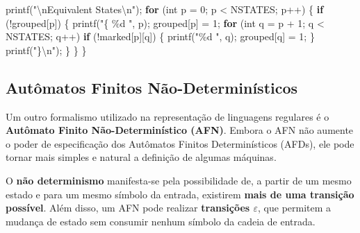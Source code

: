 \documentclass[
  brazilian,
  letterpaper,
]{book}
\newenvironment{Shaded}{\begin{snugshade}}{\end{snugshade}}
\newcommand{\ControlFlowTok}[1]{\textcolor[rgb]{0.00,0.23,0.31}{\textbf{#1}}}
\newcommand{\DataTypeTok}[1]{\textcolor[rgb]{0.68,0.00,0.00}{#1}}
\newcommand{\DecValTok}[1]{\textcolor[rgb]{0.68,0.00,0.00}{#1}}
\newcommand{\NormalTok}[1]{\textcolor[rgb]{0.00,0.23,0.31}{#1}}
\newcommand{\OperatorTok}[1]{\textcolor[rgb]{0.37,0.37,0.37}{#1}}
\newcommand{\SpecialCharTok}[1]{\textcolor[rgb]{0.37,0.37,0.37}{#1}}
\newcommand{\StringTok}[1]{\textcolor[rgb]{0.13,0.47,0.30}{#1}}
\theoremstyle{plain}
\theoremstyle{definition}
\theoremstyle{remark}
\begin{document}
\begin{Shaded}
\begin{Highlighting}[]
\NormalTok{    printf}\OperatorTok{(}\StringTok{"}\SpecialCharTok{\textbackslash{}n}\StringTok{Equivalent States}\SpecialCharTok{\textbackslash{}n}\StringTok{"}\OperatorTok{);}
    \ControlFlowTok{for} \OperatorTok{(}\DataTypeTok{int}\NormalTok{ p }\OperatorTok{=} \DecValTok{0}\OperatorTok{;}\NormalTok{ p }\OperatorTok{\textless{}}\NormalTok{ NSTATES}\OperatorTok{;}\NormalTok{ p}\OperatorTok{++)}
    \OperatorTok{\{}
        \ControlFlowTok{if} \OperatorTok{(!}\NormalTok{grouped}\OperatorTok{[}\NormalTok{p}\OperatorTok{])}
        \OperatorTok{\{}
\NormalTok{            printf}\OperatorTok{(}\StringTok{"\{ }\SpecialCharTok{\%d}\StringTok{ "}\OperatorTok{,}\NormalTok{ p}\OperatorTok{);}
\NormalTok{            grouped}\OperatorTok{[}\NormalTok{p}\OperatorTok{]} \OperatorTok{=} \DecValTok{1}\OperatorTok{;}
            \ControlFlowTok{for} \OperatorTok{(}\DataTypeTok{int}\NormalTok{ q }\OperatorTok{=}\NormalTok{ p }\OperatorTok{+} \DecValTok{1}\OperatorTok{;}\NormalTok{ q }\OperatorTok{\textless{}}\NormalTok{ NSTATES}\OperatorTok{;}\NormalTok{ q}\OperatorTok{++)}
                \ControlFlowTok{if} \OperatorTok{(!}\NormalTok{marked}\OperatorTok{[}\NormalTok{p}\OperatorTok{][}\NormalTok{q}\OperatorTok{])} \OperatorTok{\{}
\NormalTok{                    printf}\OperatorTok{(}\StringTok{"}\SpecialCharTok{\%d}\StringTok{ "}\OperatorTok{,}\NormalTok{ q}\OperatorTok{);}
\NormalTok{                    grouped}\OperatorTok{[}\NormalTok{q}\OperatorTok{]} \OperatorTok{=} \DecValTok{1}\OperatorTok{;}
                \OperatorTok{\}}
\NormalTok{            printf}\OperatorTok{(}\StringTok{"\}}\SpecialCharTok{\textbackslash{}n}\StringTok{"}\OperatorTok{);}
        \OperatorTok{\}}
    \OperatorTok{\}}
\OperatorTok{\}}
\end{Highlighting}
\end{Shaded}

\subsection{Autômatos Finitos
Não-Determinísticos}\label{autuxf4matos-finitos-nuxe3o-determinuxedsticos}

Um outro formalismo utilizado na representação de linguagens regulares é
o \textbf{Autômato Finito Não-Determinístico (AFN)}. Embora o AFN não
aumente o poder de especificação dos Autômatos Finitos Determinísticos
(AFDs), ele pode tornar mais simples e natural a definição de algumas
máquinas.

O \textbf{não determinismo} manifesta-se pela possibilidade de, a partir
de um mesmo estado e para um mesmo símbolo da entrada, existirem
\textbf{mais de uma transição possível}. Além disso, um AFN pode
realizar \textbf{transições \(\varepsilon\)}, que permitem a mudança de
estado sem consumir nenhum símbolo da cadeia de entrada.
\end{document}
